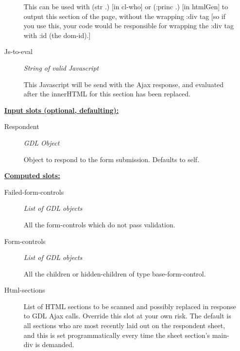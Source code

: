 \documentclass [11pt]{book}
\begin{document}
\begin{itemize}
\begin{description}
 This can be used with (str .) [in cl-who] or (:princ .) [in htmlGen]
to output this section of the page, without the wrapping :div tag [so if you use this,
your code would be responsible for wrapping the :div tag with :id (the dom-id).]




\item [Js-to-eval]
\emph{String of valid Javascript}

 This Javascript will be send with the Ajax response,
and evaluated after the innerHTML for this section has been replaced.




\end{description}






\textbf{
\underline{Input slots (optional, defaulting):}}

\begin{description}

\item [Respondent]
\emph{GDL Object}

 Object to respond to the form submission. Defaults to self.




\end{description}






\textbf{
\underline{Computed slots:}}

\begin{description}

\item [Failed-form-controls]
\emph{List of GDL objects}

 All the form-controls which do not pass validation.




\item [Form-controls]
\emph{List of GDL objects}

 All the children or hidden-children
of type base-form-control.




\item [Html-sections]

List of HTML sections to be scanned and possibly replaced in response to
GDL Ajax calls. Override this slot at your own risk. The default is all
sections who are most recently laid out on the respondent sheet, and
this is set programmatically every time the sheet section's main-div
is demanded.





\end{description}
\end{itemize}
\end{document}
